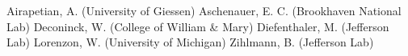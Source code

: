 Airapetian, A. (University of Giessen)
Aschenauer, E. C. (Brookhaven National Lab)
Deconinck, W. (College of William \& Mary)
Diefenthaler, M. (Jefferson Lab)
Lorenzon, W. (University of Michigan)
Zihlmann, B. (Jefferson Lab)
